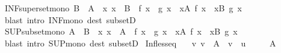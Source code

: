 \begin{isabellebody}
%
\isadelimproof
\isanewline
%
\endisadelimproof
\isanewline
{}\isamarkupfalse%
\ INF{\isacharunderscore}{\kern0pt}superset{\isacharunderscore}{\kern0pt}mono{\isacharcolon}{\kern0pt}\ {\isachardoublequoteopen}B\ {\isasymsubseteq}\ A\ {\isasymLongrightarrow}\ {\isacharparenleft}{\kern0pt}{\isasymAnd}x{\isachardot}{\kern0pt}\ x\ {\isasymin}\ B\ {\isasymLongrightarrow}\ f\ x\ {\isasymle}\ g\ x{\isacharparenright}{\kern0pt}\ {\isasymLongrightarrow}\ {\isacharparenleft}{\kern0pt}{\isasymSqinter}x{\isasymin}A{\isachardot}{\kern0pt}\ f\ x{\isacharparenright}{\kern0pt}\ {\isasymle}\ {\isacharparenleft}{\kern0pt}{\isasymSqinter}x{\isasymin}B{\isachardot}{\kern0pt}\ g\ x{\isacharparenright}{\kern0pt}{\isachardoublequoteclose}\isanewline
\ \ %
\isanewline
%
\isadelimproof
\ \ %
\endisadelimproof
%
\isatagproof
{}\isamarkupfalse%
\ {\isacharparenleft}{\kern0pt}blast\ intro{\isacharcolon}{\kern0pt}\ INF{\isacharunderscore}{\kern0pt}mono\ dest{\isacharcolon}{\kern0pt}\ subsetD{\isacharparenright}{\kern0pt}%
\endisatagproof
{\isafoldproof}%
%
\isadelimproof
\isanewline
%
\endisadelimproof
\isanewline
{}\isamarkupfalse%
\ SUP{\isacharunderscore}{\kern0pt}subset{\isacharunderscore}{\kern0pt}mono{\isacharcolon}{\kern0pt}\ {\isachardoublequoteopen}A\ {\isasymsubseteq}\ B\ {\isasymLongrightarrow}\ {\isacharparenleft}{\kern0pt}{\isasymAnd}x{\isachardot}{\kern0pt}\ x\ {\isasymin}\ A\ {\isasymLongrightarrow}\ f\ x\ {\isasymle}\ g\ x{\isacharparenright}{\kern0pt}\ {\isasymLongrightarrow}\ {\isacharparenleft}{\kern0pt}{\isasymSqunion}x{\isasymin}A{\isachardot}{\kern0pt}\ f\ x{\isacharparenright}{\kern0pt}\ {\isasymle}\ {\isacharparenleft}{\kern0pt}{\isasymSqunion}x{\isasymin}B{\isachardot}{\kern0pt}\ g\ x{\isacharparenright}{\kern0pt}{\isachardoublequoteclose}\isanewline
%
\isadelimproof
\ \ %
\endisadelimproof
%
\isatagproof
{}\isamarkupfalse%
\ {\isacharparenleft}{\kern0pt}blast\ intro{\isacharcolon}{\kern0pt}\ SUP{\isacharunderscore}{\kern0pt}mono\ dest{\isacharcolon}{\kern0pt}\ subsetD{\isacharparenright}{\kern0pt}%
\endisatagproof
{\isafoldproof}%
%
\isadelimproof
\isanewline
%
\endisadelimproof
\isanewline
{}\isamarkupfalse%
\ Inf{\isacharunderscore}{\kern0pt}less{\isacharunderscore}{\kern0pt}eq{\isacharcolon}{\kern0pt}\isanewline
\ \ \ {\isachardoublequoteopen}{\isasymAnd}v{\isachardot}{\kern0pt}\ v\ {\isasymin}\ A\ {\isasymLongrightarrow}\ v\ {\isasymle}\ u{\isachardoublequoteclose}\isanewline
\ \ \ \ \ {\isachardoublequoteopen}A\ {\isasymnoteq}\ {\isacharbraceleft}{\kern0pt}{\isacharbraceright}{\kern0pt}{\isachardoublequoteclose}\isanewline

\end{isabellebody}
